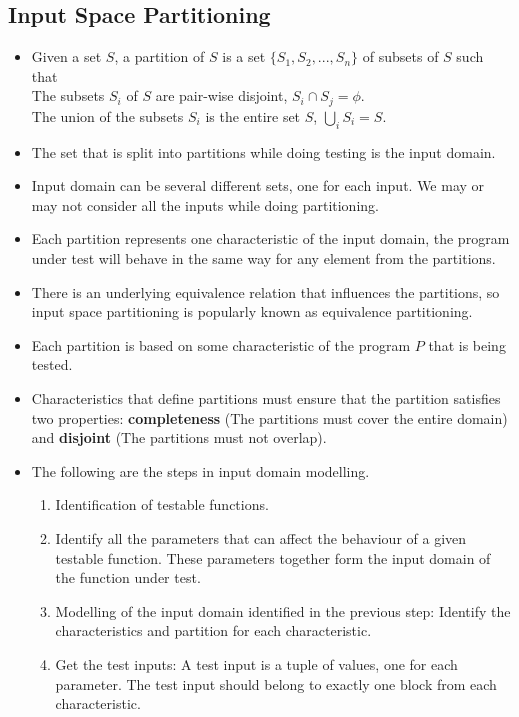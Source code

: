\documentclass[a4paper]{article}
\begin{document}
\subsection{Input Space Partitioning}
\begin{itemize}
    \item Given a set $S$, a partition of $S$ is a set $\{S_1,S_2,...,S_n\}$ of subsets of $S$ such that\\
    The subsets $S_i$ of $S$ are pair-wise disjoint, $S_i\cap S_j=\phi$.\\
    The union of the subsets $S_i$ is the entire set $S$, $\bigcup_iS_i=S$.
    \item The set that is split into partitions while doing testing is the input domain.
    \item Input domain can be several different sets, one for each input. We may or may not consider all the inputs while doing partitioning.
    \item Each partition represents one characteristic of the input domain, the program under test will behave in the same way for any element from the partitions.
    \item There is an underlying equivalence relation that influences the partitions, so input space partitioning is popularly known as equivalence partitioning.
    \item Each partition is based on some characteristic of the program $P$ that is being tested.
    \item Characteristics that define partitions must ensure that the partition satisfies two properties: \textbf{completeness} (The partitions must cover the entire domain) and \textbf{disjoint} (The partitions must not overlap).
    \item The following are the steps in input domain modelling.
    \begin{enumerate}
        \item Identification of testable functions.
        \item Identify all the parameters that can affect the behaviour of a given testable function. These parameters together form the input domain of the function under test.
        \item Modelling of the input domain identified in the previous step: Identify the characteristics and partition for each characteristic.
        \item Get the test inputs: A test input is a tuple of values, one for each parameter. The test input should belong to exactly one block from each characteristic.

\end{enumerate}
\end{itemize}
\end{document}
